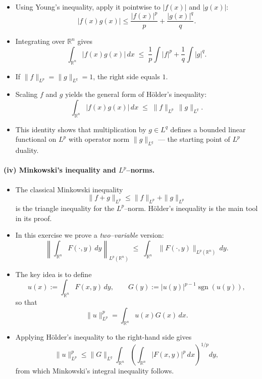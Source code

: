 \documentclass[12pt,a4paper]{article}
\theoremstyle{plain}
\theoremstyle{definition}
\theoremstyle{remark}
\theoremstyle{remark}
\begin{document}
\begin{itemize}
	\item Using Young's inequality, apply it pointwise to
	$|f(x)|$ and $|g(x)|$:
	\[
	|f(x)g(x)|
	\le
	\frac{|f(x)|^p}{p} + \frac{|g(x)|^q}{q}.
	\]
	
	\item Integrating over $\mathbb{R}^n$ gives
	\[
	\int_{\mathbb{R}^n} |f(x)g(x)|\,dx
	\;\le\;
	\frac{1}{p}\int |f|^p + \frac{1}{q}\int |g|^q.
	\]
	
	\item If $\|f\|_{L^p}=\|g\|_{L^q}=1$, the right side equals $1$.
	
	\item Scaling $f$ and $g$ yields the general form of Hölder's inequality:
	\[
	\int_{\mathbb{R}^n} |f(x)g(x)|\,dx
	\;\le\;
	\|f\|_{L^p}\,\|g\|_{L^q}.
	\]
	
	\item This identity shows that multiplication by $g\in L^q$ defines a
	bounded linear functional on $L^p$ with operator norm $\|g\|_{L^q}$
	--- the starting point of $L^p$ duality.
\end{itemize}

\bigskip

\paragraph*{(iv) Minkowski's inequality and $L^p$--norms.}

\begin{itemize}
	
	\item The classical Minkowski inequality
	\[
	\|f+g\|_{L^p}
	\le
	\|f\|_{L^p} + \|g\|_{L^p}
	\]
	is the triangle inequality for the $L^p$--norm.  Hölder's inequality
	is the main tool in its proof.
	
	\item In this exercise we prove a \emph{two--variable} version:
	\[
	\left\|
	\int_{\mathbb{R}^n} F(\cdot,y)\,dy
	\right\|_{L^p(\mathbb{R}^n)}
	\;\le\;
	\int_{\mathbb{R}^n}
	\|F(\cdot,y)\|_{L^p(\mathbb{R}^n)}\,dy.
	\]
	
	\item The key idea is to define
	\[
	u(x) := \int_{\mathbb{R}^n} F(x,y)\,dy,
	\qquad
	G(y) := |u(y)|^{p-1}\operatorname{sgn}(u(y)),
	\]
	so that
	\[
	\|u\|_{L^p}^p = \int_{\mathbb{R}^n} u(x) G(x)\,dx.
	\]
	
	\item Applying Hölder's inequality to the right-hand side gives
	\[
	\|u\|_{L^p}^p
	\le
	\|G\|_{L^q}
	\int_{\mathbb{R}^n}
	\left(
	\int_{\mathbb{R}^n} |F(x,y)|^p \, dx
	\right)^{1/p} dy,
	\]
	from which Minkowski's integral inequality follows.
	
\end{itemize}
\end{document}
